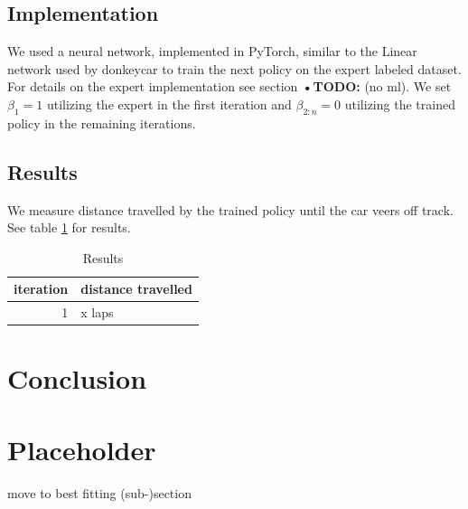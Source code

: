 \documentclass[conference]{IEEEtran}
\begin{document}
\subsection{Implementation}
We used a neural network, implemented in PyTorch, similar to the Linear network used by donkeycar to train the next policy on the expert labeled dataset. For details on the expert implementation see section \textbf{•TODO:} (no ml). We set \( \beta_1 = 1 \) utilizing the expert in the first iteration and \( \beta_{2:n} = 0 \) utilizing the trained policy in the remaining iterations.

\subsection{Results}
We measure distance travelled by the trained policy until the car veers off track. See table \ref{tab:results} for results.

\begin{table}[!t]
\renewcommand{\arraystretch}{1.3}
\caption{Results}
\centering
\begin{tabular}{r|l}
iteration&distance travelled\\
\hline
1&x laps\\
\end{tabular}
\label{tab:results}
\end{table}

\section{Conclusion}

\section{Placeholder}

move to best fitting (sub-)section

\begin{video}[!t]
	\caption{Dataset with control values.}
	\label{vid:datacrtl}
\end{video}
\end{document}

